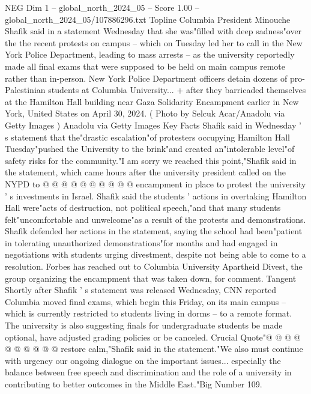 \begin{textsample}{NEG Dim 1 – global\_north\_2024\_05 – Score 1.00 – global\_north\_2024\_05/107886296.txt}  \label{ex:f1_neg_051}
Topline Columbia President Minouche Shafik said in a statement Wednesday that she was"filled with deep sadness"over the the recent protests on campus -- which on Tuesday led her to call in the New York Police Department, leading to mass arrests -- as the university reportedly made all final exams that were supposed to be held on main campus remote rather than in-person.
New York Police Department officers detain dozens of pro-Palestinian students at Columbia University... + after they barricaded themselves at the Hamilton Hall building near Gaza Solidarity Encampment earlier in New York, United States on April 30, 2024. ( Photo by Selcuk Acar/Anadolu via Getty Images ) Anadolu via Getty Images Key Facts Shafik said in Wednesday ' s statement that the"drastic escalation"of protesters occupying Hamilton Hall Tuesday"pushed the University to the brink"and created an"intolerable level"of safety risks for the community."I am sorry we reached this point,"Shafik said in the statement, which came hours after the university president called on the NYPD to @ @ @ @ @ @ @ @ @ @ encampment in place to protest the university ' s investments in Israel.
Shafik said the students ' actions in overtaking Hamilton Hall were"acts of destruction, not political speech,"and that many students felt"uncomfortable and unwelcome"as a result of the protests and demonstrations.
Shafik defended her actions in the statement, saying the school had been"patient in tolerating unauthorized demonstrations"for months and had engaged in negotiations with students urging divestment, despite not being able to come to a resolution.
Forbes has reached out to Columbia University Apartheid Divest, the group organizing the encampment that was taken down, for comment.
Tangent Shortly after Shafik ' s statement was released Wednesday, CNN reported Columbia moved final exams, which begin this Friday, on its main campus -- which is currently restricted to students living in dorms -- to a remote format.
The university is also suggesting finals for undergraduate students be made optional, have adjusted grading policies or be canceled.
Crucial Quote"@ @ @ @ @ @ @ @ @ @ restore calm,"Shafik said in the statement."We also must continue with urgency our ongoing dialogue on the important issues... especially the balance between free speech and discrimination and the role of a university in contributing to better outcomes in the Middle East."Big Number 109.

\end{textsample}
